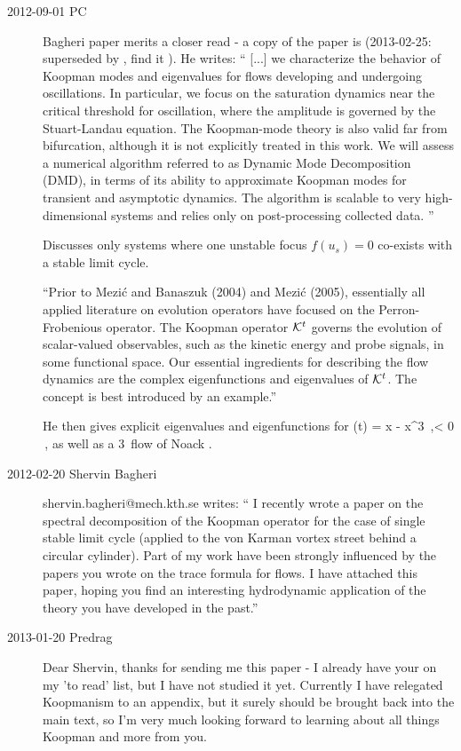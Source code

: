 \begin{description}
\item[2012-09-01 PC]							\toCB
Bagheri paper merits a closer read - a copy of the paper is
(2013-02-25: superseded by , find it
). He writes:
``
[...] we characterize the behavior of Koopman modes and
eigenvalues for flows developing and undergoing oscillations. In
particular, we focus on the saturation dynamics near the critical
threshold for oscillation, where the amplitude is governed by the
Stuart-Landau equation. The Koopman-mode theory is also valid far from
bifurcation, although it is not explicitly treated in this work. We will
assess a numerical algorithm referred to as Dynamic Mode Decomposition
(DMD), in terms of its ability to approximate Koopman modes for transient
and asymptotic dynamics. The algorithm is scalable to very
high-dimensional systems and relies only on post-processing collected
data.
''

Discusses only systems where one
unstable focus $f (u_s) = 0$ co-exists with a stable limit cycle.

``Prior to Mezi\'c and Banaszuk (2004) and Mezi\'c (2005), essentially
all applied literature on evolution operators have focused on the
Perron-Frobenious operator. The Koopman operator ${\cal K}^t$
governs the evolution of scalar-valued
observables, such as the kinetic energy and probe signals, in some
functional space. Our essential ingredients for describing the flow
dynamics are the complex eigenfunctions and eigenvalues of ${\cal K}^t$. The
concept is best introduced by an example.''

He then gives explicit
eigenvalues and eigenfunctions for
\beq
{}(t) = \mu x - x^3 \,,\qquad \mu  < 0
\,,
as well as a 3\dmn\ flow of Noack \etal.

\item[2012-02-20  Shervin Bagheri]
shervin.bagheri@mech.kth.se writes: `` I recently wrote a paper on
the spectral decomposition of the Koopman operator for the case of
single stable limit cycle (applied to the von Karman vortex street
behind a circular cylinder). Part of my work have been strongly
influenced by the papers you wrote on the trace formula for flows.  I
have attached this paper, hoping you find an interesting hydrodynamic
application of the theory you have developed in the past.''

\item[2013-01-20 Predrag] Dear Shervin, thanks for sending me this paper
- I already have your  on my 'to read' list,
but I have not studied it yet. Currently I have relegated Koopmanism
to an appendix, but it surely should be brought back into the main
text, so I'm very much looking forward to learning about all things
Koopman and more from you.


\end{description}
